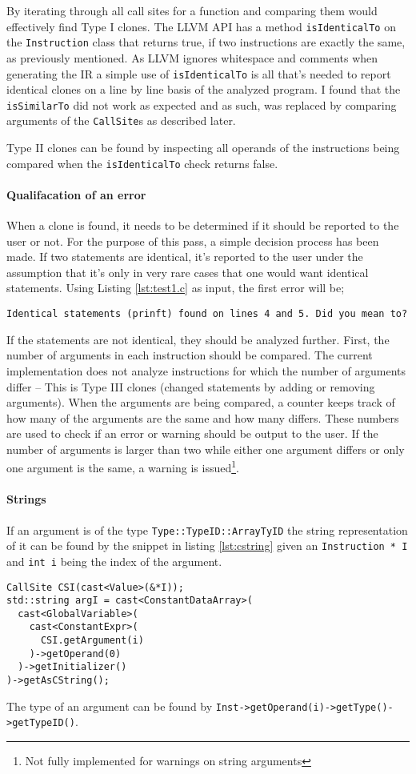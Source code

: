 \documentclass[a4paper,11pt]{article}
\theoremstyle{mytheor}
\begin{document}
By iterating through all call sites for a function and comparing them would effectively find Type I clones.
The LLVM API has a method \verb!isIdenticalTo! on the \verb!Instruction! class that returns true, if two instructions are exactly the same, as previously mentioned.
As LLVM ignores whitespace and comments when generating the IR a simple use of \verb!isIdenticalTo! is all that's needed to report identical clones on a line by line basis of the analyzed program.
I found that the \verb!isSimilarTo! did not work as expected and as such, was replaced by comparing arguments of the \verb!CallSite!s as described later.

Type II clones can be found by inspecting all operands of the instructions being compared when the \verb!isIdenticalTo! check returns false.

\paragraph{Qualifacation of an error}
When a clone is found, it needs to be determined if it should be reported to the user or not.
For the purpose of this pass, a simple decision process has been made.
If two statements are identical, it's reported to the user under the assumption that it's only in very rare cases that one would want identical statements. Using Listing \ref{lst:test1.c} as input, the first error will be;
\begin{verbatim}
Identical statements (prinft) found on lines 4 and 5. Did you mean to?
\end{verbatim}

If the statements are not identical, they should be analyzed further. First, the number of arguments in each instruction should be compared.
The current implementation does not analyze instructions for which the number of arguments differ -- This is Type III clones (changed statements by adding or removing arguments).
When the arguments are being compared, a counter keeps track of how many of the arguments are the same and how many differs.
These numbers are used to check if an error or warning should be output to the user.
If the number of arguments is larger than two while either one argument differs or only one argument is the same, a warning is issued\footnote{Not fully implemented for warnings on string arguments}.

\paragraph{Strings}
If an argument is of the type \verb!Type::TypeID::ArrayTyID! the string representation of it can be found by the snippet in listing \ref{lst:cstring} given an \verb!Instruction * I! and \verb!int i! being the index of the argument.
\begin{lstlisting}[caption=Getting method argument as a string,label={lst:cstring}]
CallSite CSI(cast<Value>(&*I));
std::string argI = cast<ConstantDataArray>(
  cast<GlobalVariable>(
    cast<ConstantExpr>(
      CSI.getArgument(i)
    )->getOperand(0)
  )->getInitializer()
)->getAsCString();
\end{lstlisting}
The type of an argument can be found by \verb!Inst->getOperand(i)->getType()->getTypeID()!.
\end{document}
